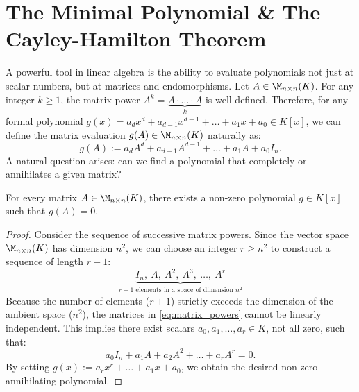 \setcounter{section}{3} %

\renewcommand{\thetheorem}{21.d.\arabic{theorem}}
\setcounter{theorem}{0}
\section{The Minimal Polynomial \& The Cayley-Hamilton Theorem}

A powerful tool in linear algebra is the ability to evaluate polynomials not just at scalar numbers, but at matrices and endomorphisms. Let $A \in \M_{n \times n}(K)$. For any integer $k \ge 1$, the matrix power $A^k = \underbrace{A \cdot \dots \cdot A}_{k}$ is well-defined. Therefore, for any formal polynomial $g(x) = a_d x^d + a_{d-1}x^{d-1} + \dots + a_1 x + a_0 \in K[x]$, we can define the matrix evaluation $g(A) \in \M_{n \times n}(K)$ naturally as:
\[
g(A) := a_d A^d + a_{d-1}A^{d-1} + \dots + a_1 A + a_0 I_n.
\]
A natural question arises: can we find a polynomial that completely  or annihilates a given matrix?

\begin{claim*}\label{claim:existence_annihilating}
  For every matrix $A \in \M_{n \times n}(K)$, there exists a non-zero polynomial $g \in K[x]$ such that $g(A) = 0$.
\end{claim*}

\begin{proof}
  Consider the sequence of successive matrix powers. Since the vector space $\M_{n \times n}(K)$ has dimension $n^2$, we can choose an integer $r \ge n^2$ to construct a sequence of length $r+1$:
  \begin{equation} \label{eq:matrix_powers}
    \underbrace{I_n, \ A, \ A^2, \ A^3, \ \dots, \ A^r}_{r+1 \text{ elements in a space of dimension } n^2}
  \end{equation}
  Because the number of elements ($r+1$) strictly exceeds the dimension of the ambient space ($n^2$), the matrices in \eqref{eq:matrix_powers} cannot be linearly independent. This implies there exist scalars $a_0, a_1, \dots, a_r \in K$, not all zero, such that:
  \[
  a_0 I_n + a_1 A + a_2 A^2 + \dots + a_r A^r = 0.
  \]
  By setting $g(x) := a_r x^r + \dots + a_1 x + a_0$, we obtain the desired non-zero annihilating polynomial.
\end{proof}


